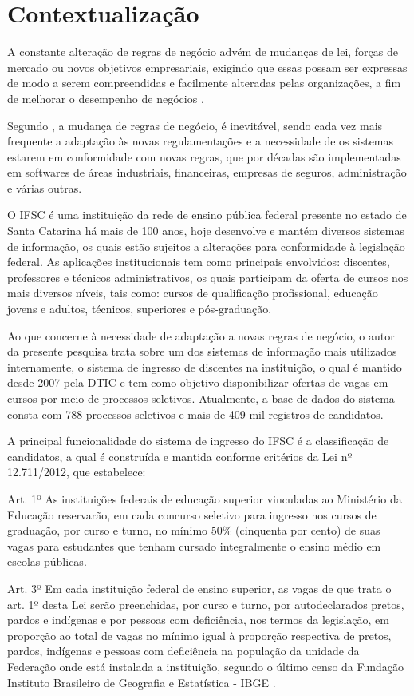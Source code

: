 \section{Contextualização}
\label{contextualizacao}

 A constante alteração de regras de negócio advém de mudanças de lei, forças de mercado ou novos objetivos empresariais, exigindo que essas possam ser expressas de modo a serem compreendidas e facilmente alteradas pelas organizações, a fim de melhorar o desempenho de negócios \cite{flexiblerules}.
 
 Segundo , a mudança de regras de negócio, é inevitável, sendo cada vez mais frequente a adaptação às novas regulamentações e a necessidade de os sistemas estarem em conformidade com novas regras, que por décadas são implementadas em softwares de áreas industriais, financeiras, empresas de seguros, administração e várias outras.
 
 O \gls{IFSC} é uma instituição da rede de ensino pública federal presente no estado de Santa Catarina há mais de 100 anos, hoje desenvolve e mantém diversos sistemas de informação, os quais estão sujeitos a alterações para conformidade à legislação federal. As aplicações institucionais tem como principais envolvidos: discentes, professores e técnicos administrativos, os quais participam da oferta de cursos nos mais diversos níveis, tais como: cursos de qualificação profissional, educação jovens e adultos, técnicos, superiores e pós-graduação. 
 
 Ao que concerne à necessidade de adaptação a novas regras de negócio, o autor da presente pesquisa trata sobre um dos sistemas de informação mais utilizados internamente, o sistema de ingresso de discentes na instituição, o qual é mantido desde 2007 pela \gls{DTIC} e tem como objetivo disponibilizar ofertas de vagas em cursos por meio de processos seletivos. Atualmente, a base de dados do sistema consta com 788 processos seletivos e mais de 409 mil registros de candidatos.
 
 A principal funcionalidade do sistema de ingresso do \gls{IFSC} é a classificação de candidatos, a qual é construída e mantida conforme critérios da Lei nº 12.711/2012, que estabelece:
 \begin{citacao}
 Art. 1º As instituições federais de educação superior vinculadas ao Ministério da Educação reservarão, em cada concurso seletivo para ingresso nos cursos de graduação, por curso e turno, no mínimo 50\% (cinquenta por cento) de suas vagas para estudantes que tenham cursado integralmente o ensino médio em escolas públicas.
 
 Art. 3º Em cada instituição federal de ensino superior, as vagas de que trata o art. 1º desta Lei serão preenchidas, por curso e turno, por autodeclarados pretos, pardos e indígenas e por pessoas com deficiência, nos termos da legislação, em proporção ao total de vagas no mínimo igual à proporção respectiva de pretos, pardos, indígenas e pessoas com deficiência na população da unidade da Federação onde está instalada a instituição, segundo o último censo da Fundação Instituto Brasileiro de Geografia e Estatística - IBGE \cite{leicotas}.  
 \end{citacao}
 
